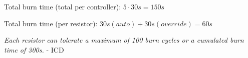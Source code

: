 
Total burn time (total per controller): $5 \cdot 30s = 150s$

Total burn time (per resistor): $30s (auto) + 30s (override) = 60s$

\textit{Each resistor can tolerate a maximum of 100 burn cycles or a cumulated burn time of 300s.} - ICD\textsl{}

